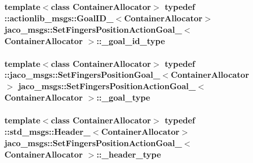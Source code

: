 \subsubsection[{\texorpdfstring{\+\_\+goal\+\_\+id\+\_\+type}{_goal_id_type}}]{\setlength{\rightskip}{0pt plus 5cm}template$<$class Container\+Allocator$>$ typedef \+::actionlib\+\_\+msgs\+::\+Goal\+I\+D\+\_\+$<$Container\+Allocator$>$ {\bf jaco\+\_\+msgs\+::\+Set\+Fingers\+Position\+Action\+Goal\+\_\+}$<$ Container\+Allocator $>$\+::{\bf \+\_\+goal\+\_\+id\+\_\+type}}\hypertarget{structjaco__msgs_1_1SetFingersPositionActionGoal___abbed6c9e246b67002f6688488b9194cf}{}\label{structjaco__msgs_1_1SetFingersPositionActionGoal___abbed6c9e246b67002f6688488b9194cf}
\subsubsection[{\texorpdfstring{\+\_\+goal\+\_\+type}{_goal_type}}]{\setlength{\rightskip}{0pt plus 5cm}template$<$class Container\+Allocator$>$ typedef \+::{\bf jaco\+\_\+msgs\+::\+Set\+Fingers\+Position\+Goal\+\_\+}$<$Container\+Allocator$>$ {\bf jaco\+\_\+msgs\+::\+Set\+Fingers\+Position\+Action\+Goal\+\_\+}$<$ Container\+Allocator $>$\+::{\bf \+\_\+goal\+\_\+type}}\hypertarget{structjaco__msgs_1_1SetFingersPositionActionGoal___a6221e777345b9fb8eba1888205ac5c25}{}\label{structjaco__msgs_1_1SetFingersPositionActionGoal___a6221e777345b9fb8eba1888205ac5c25}
\subsubsection[{\texorpdfstring{\+\_\+header\+\_\+type}{_header_type}}]{\setlength{\rightskip}{0pt plus 5cm}template$<$class Container\+Allocator$>$ typedef \+::std\+\_\+msgs\+::\+Header\+\_\+$<$Container\+Allocator$>$ {\bf jaco\+\_\+msgs\+::\+Set\+Fingers\+Position\+Action\+Goal\+\_\+}$<$ Container\+Allocator $>$\+::{\bf \+\_\+header\+\_\+type}}\hypertarget{structjaco__msgs_1_1SetFingersPositionActionGoal___aeee4ff5a362ba3a4fcf0f858f5c9ec85}{}\label{structjaco__msgs_1_1SetFingersPositionActionGoal___aeee4ff5a362ba3a4fcf0f858f5c9ec85}
